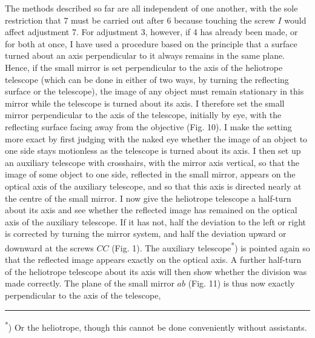 \par\noindent\hspace*{\parindent}The methods described so far are all independent of one another, with the sole restriction that 7 must be carried out after 6 because touching the screw $I$ would affect adjustment 7. For adjustment 3, however, if 4 has already been made, or for both at once, I have used a procedure based on the principle that a surface turned about an axis perpendicular to it always remains in the same plane. Hence, if the small mirror is set perpendicular to the axis of the heliotrope telescope (which can be done in either of two ways, by turning the reflecting surface  or  the telescope), the image of any object must remain stationary in this mirror while the telescope is turned about its axis. I therefore set the small mirror perpendicular to the axis of the telescope, initially by eye, with the reflecting surface facing away from the objective (Fig. 10). I make the setting more exact by first judging with the naked eye whether the image of an object to one side stays motionless as the telescope is turned about its axis. I then set up an auxiliary telescope with crosshairs, with the mirror axis vertical, so that the image of some object to one side, reflected in the small mirror, appears on the optical axis of the auxiliary telescope, and so that this axis is directed nearly at the centre of the small mirror. I now give the heliotrope telescope a half-turn about its axis and see whether the reflected image has remained on the optical axis of the auxiliary telescope. If it has not, half the deviation to the left or right is corrected by turning the mirror system, and half the deviation upward or downward at the screws $CC$ (Fig. 1). The auxiliary telescope\textsuperscript{*}) is pointed again so that the reflected image appears exactly on the optical axis. A further half-turn of the heliotrope telescope about its axis will then show whether the division was made correctly. The plane of the small mirror $ab$ (Fig. 11) is thus now exactly perpendicular to the axis of the telescope,
\par\medskip\noindent\rule{4cm}{.4pt}\par
\begingroup\footnotesize\noindent\hspace*{\parindent}\textsuperscript{*}) Or the heliotrope, though this cannot be done conveniently without assistants.\par\endgroup
\par\medskip\noindent\makebox[.86\linewidth][r]{60\textsuperscript{*}}\par

